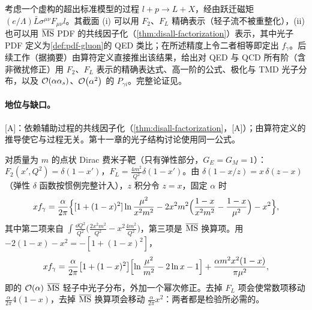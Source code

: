 \begin{proofsketch}
考虑一个虚构的超出标准模型的过程 $l+p\to L+X$，经由跃迁磁矩 $(e/\Lambda)\bar L\sigma^{\mu\nu}F_{\mu\nu}l$。其截面 (i) 可以用 $F_2$、$F_L$ 精确表示（轻子流不被重整化），(ii) 也可以用 $\overline{\mathrm{MS}}$ PDF 的共线因子化（\cref{thm:disall-factorization}）表示，其中光子 PDF 定义为\cref{def:pdf-gluon}的 QED 类比；在所述精度上令二者相等即定出 $f_\gamma$。后续工作\cite{Manohar:2017eqh}（据摘要）由算符定义直接推出该结果，给出对 QED 与 QCD 所有阶（含非微扰修正）用 $F_2$、$F_L$ 表示的精确表达式、高一阶的公式、极化与 TMD 光子分布，以及 $\mathcal{O}\!\left(\alpha\alpha_s\right)$、$\mathcal{O}\!\left(\alpha^2\right)$ 的 $P_{\gamma i}$。完整论证见\cite{Manohar:2016nzj,Manohar:2017eqh}。
\end{proofsketch}

\paragraph{地位与缺口。}[A]：依赖辅助过程的共线因子化（\cref{thm:disall-factorization}，[A]）；由算符定义的推导使它与过程无关。第十一章的光子结构讨论使用同一公式。

\begin{example}[点状靶极限]\label{ex:front-luxqed-pointlike}
对质量为 $m$ 的点状 Dirac 费米子靶（只有弹性部分，$G_E=G_M=1$）：$F_2(x',Q^2)=\delta(1-x')$，$F_L=\frac{4m^2}{Q^2}\delta(1-x')$。由 $\delta(1-x/z)=x\,\delta(z-x)$（弹性 $\delta$ 函数按惯例完整计入），$z$ 积分令 $z=x$，固定 $\alpha$ 时
\begin{equation*}
xf_\gamma=\frac{\alpha}{2\pi}\Bigl\{[1+(1-x)^2]\ln\frac{\mu^2}{x^2m^2}-2x^2m^2\Bigl(\frac{1-x}{x^2m^2}-\frac{1-x}{\mu^2}\Bigr)-x^2\Bigr\},
\end{equation*}
其中第二项来自 $\int\frac{\dd Q^2}{Q^2}\bigl(\frac{2x^2m^2}{Q^2}-x^2\frac{4m^2}{Q^2}\bigr)$，第三项是 $\overline{\mathrm{MS}}$ 换算项。用 $-2(1-x)-x^2=-[1+(1-x)^2]$，
\begin{equation}\label{eq:front-luxqed-point}
xf_\gamma=\frac{\alpha}{2\pi}\bigl[1+(1-x)^2\bigr]\Bigl[\ln\frac{\mu^2}{m^2}-2\ln x-1\Bigr]+\frac{\alpha m^2x^2(1-x)}{\pi\mu^2},
\end{equation}
即\cite[式~(4.189)]{Frixione:2019lga}的 $\mathcal{O}\!\left(\alpha\right)$ $\overline{\mathrm{MS}}$ 轻子中光子分布，外加一个幂次修正。去掉 $F_L$ 项会使常数项移动 $\frac{\alpha}{2\pi}4(1-x)$，去掉 $\overline{\mathrm{MS}}$ 换算项会移动 $\frac{\alpha}{2\pi}x^2$：两者都是检验所必需的。
\end{example}

